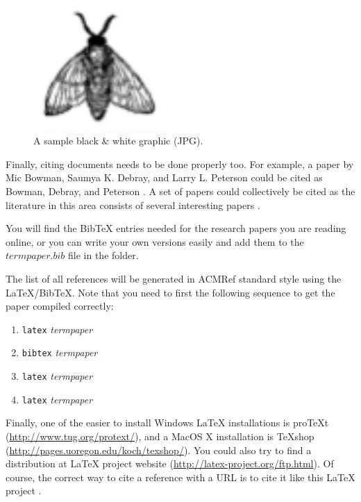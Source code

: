 \documentclass{sig-alternate}
\begin{document}
\begin{figure}[htb]
\label{sample graphic}
\begin{center}
\includegraphics[width=2in]{fly.jpg}
\caption{A sample black \& white graphic (JPG).}
\label{sample graphic}
\end{center}
\end{figure}

Finally, citing documents needs to be done properly too. For
example, a paper by Mic Bowman, Saumya K. Debray, and Larry
L. Peterson could be cited as Bowman, Debray, and Peterson
\cite{bowman:reasoning}. A set of papers could collectively
be cited as the literature in this area consists of several
interesting papers
\cite{braams:babel,clark:pct,herlihy:methodology}.

You will find the BibTeX entries needed for the research papers you are
reading online, or you can write your own versions easily and add them
to the $termpaper.bib$ file in the folder.

The list of all references will be generated in ACMRef
standard style using the \LaTeX{}/BibTeX. Note that you
need to first the following sequence to get the paper
compiled correctly:

\begin{enumerate}
\item {\tt latex} {\em termpaper}
\item {\tt bibtex} {\em termpaper}
\item {\tt latex} {\em termpaper}
\item {\tt latex} {\em termpaper}
\end{enumerate}

Finally, one of the easier to install Windows \LaTeX{} installations
is proTeXt (\url{http://www.tug.org/protext/}), and a MacOS X
installation is TeXshop
(\url{http://pages.uoregon.edu/koch/texshop/}). You could also try to
find a distribution at \LaTeX{} project website
(\url{http://latex-project.org/ftp.html}). Of course, the correct way
to cite a reference with a URL is to cite it like this \LaTeX{}
project \cite{Latex-distro}.



\balance
\end{document}
